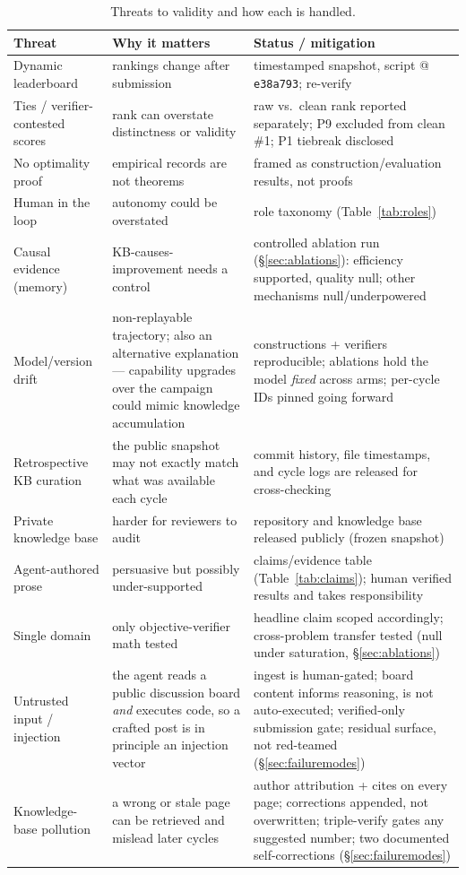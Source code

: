 \documentclass[11pt]{article}
\begin{document}
\begin{table}[htbp]
\centering
\caption{Threats to validity and how each is handled.}
\label{tab:threats}
\begin{tabular}{p{}p{}p{}}
\toprule
Threat & Why it matters & Status / mitigation \\
\midrule
Dynamic leaderboard & rankings change after submission & timestamped snapshot, script @ \texttt{e38a793}; re-verify \\
Ties / verifier-contested scores & rank can overstate distinctness or validity & raw vs.\ clean rank reported separately; P9 excluded from clean \#1; P1 tiebreak disclosed \\
No optimality proof & empirical records are not theorems & framed as construction/evaluation results, not proofs \\
Human in the loop & autonomy could be overstated & role taxonomy (Table~\ref{tab:roles}) \\
Causal evidence (memory) & KB-causes-improvement needs a control & controlled ablation run (\S\ref{sec:ablations}): efficiency supported, quality null; other mechanisms null/underpowered \\
Model/version drift & non-replayable trajectory; also an alternative explanation --- capability upgrades over the campaign could mimic knowledge accumulation & constructions + verifiers reproducible; ablations hold the model \emph{fixed} across arms; per-cycle IDs pinned going forward \\
Retrospective KB curation & the public snapshot may not exactly match what was available each cycle & commit history, file timestamps, and cycle logs are released for cross-checking \\
Private knowledge base & harder for reviewers to audit & repository and knowledge base released publicly (frozen snapshot) \\
Agent-authored prose & persuasive but possibly under-supported & claims/evidence table (Table~\ref{tab:claims}); human verified results and takes responsibility \\
Single domain & only objective-verifier math tested & headline claim scoped accordingly; cross-problem transfer tested (null under saturation, \S\ref{sec:ablations}) \\
Untrusted input / injection & the agent reads a public discussion board \emph{and} executes code, so a crafted post is in principle an injection vector & ingest is human-gated; board content informs reasoning, is not auto-executed; verified-only submission gate; residual surface, not red-teamed (\S\ref{sec:failuremodes}) \\
Knowledge-base pollution & a wrong or stale page can be retrieved and mislead later cycles & author attribution + cites on every page; corrections appended, not overwritten; triple-verify gates any suggested number; two documented self-corrections (\S\ref{sec:failuremodes}) \\
\bottomrule
\end{tabular}
\end{table}
\end{document}
